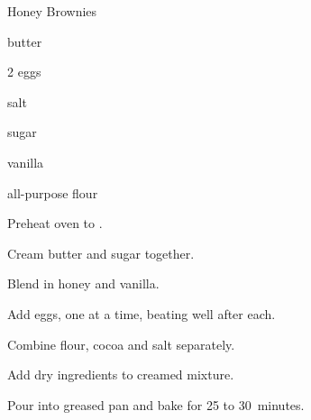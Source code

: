 \begin{recipe}{Honey Brownies}{}{}

\begin{ingredients}
\item \C{\third} butter
\item \C{\third} 
\item 2 eggs
\item \C{\third} 
\item \tp{\half} salt
\item \C{\threequarter} sugar
\item {} vanilla
\item \C{\half} all-purpose flour
\end{ingredients}

\begin{directions}
\item Preheat oven to .
\item Cream butter and sugar together.
\item Blend in honey and vanilla.
\item Add eggs, one at a time, beating well after each.
\item Combine flour, cocoa and salt separately.
\item Add dry ingredients to creamed mixture.
\item Pour into greased pan and bake for 25 to 30~minutes.
\end{directions}
\end{recipe}
